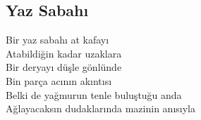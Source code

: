 \subsection{Yaz Sabahı}

Bir yaz sabahı at kafayı \\
Atabildiğin kadar uzaklara \\
Bir deryayı düşle gönlünde \\
Bin parça acının akıntısı \\
Belki de yağmurun tenle buluştuğu anda \\
Ağlayacaksın dudaklarında mazinin anısıyla